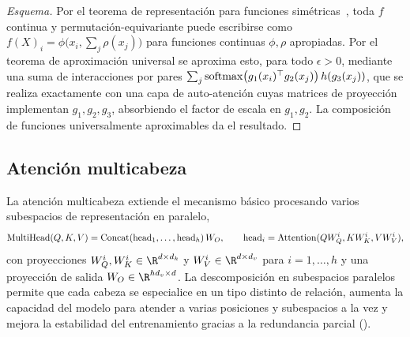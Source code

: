\begin{proof}[Esquema]
Por el teorema de representaci\'on para funciones sim\'etricas~\citep{zaheer2017deepsets},
toda $f$ continua y permutaci\'on-equivariante puede escribirse como
$f(X)_i = \phi\bigl(x_i, \sum_j \rho(x_j)\bigr)$ para funciones continuas
$\phi,\rho$ apropiadas. Por el teorema de aproximaci\'on universal se aproxima
esto, para todo $\epsilon>0$, mediante una suma de interacciones por pares
$\sum_j \operatorname{softmax}\bigl(g_1(x_i)^\top g_2(x_j)\bigr)\, h(g_3(x_j))$, que se realiza
exactamente con una capa de auto-atenci\'on cuyas matrices de proyecci\'on
implementan $g_1,g_2,g_3$, absorbiendo el factor de escala en $g_1,g_2$. La
composici\'on de funciones universalmente aproximables da el resultado.
\end{proof}

\subsection{Atenci\'on multicabeza}
\label{subsec:apps:multihead}

La atenci\'on multicabeza extiende el mecanismo b\'asico procesando varios
subespacios de representaci\'on en paralelo,
\[
  \operatorname{MultiHead}(Q,K,V) = \operatorname{Concat}(\mathrm{head}_1,\dots,\mathrm{head}_h)\,W_O,
  \qquad
  \mathrm{head}_i = \operatorname{Attention}(QW_Q^i, KW_K^i, VW_V^i),
\]
con proyecciones $W_Q^i, W_K^i \in \R^{d\times d_k}$ y
$W_V^i \in \R^{d\times d_v}$ para $i = 1,\dots,h$ y una proyecci\'on de salida
$W_O \in \R^{hd_v\times d}$. La descomposici\'on en subespacios paralelos permite
que cada cabeza se especialice en un tipo distinto de relaci\'on, aumenta la
capacidad del modelo para atender a varias posiciones y subespacios a la vez y
mejora la estabilidad del entrenamiento gracias a la redundancia parcial
().


